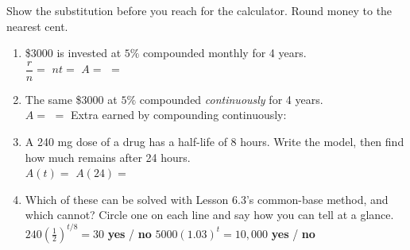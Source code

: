 \documentclass[10pt]{article}
\begin{document}
\begin{practicebox}
Show the substitution before you reach for the calculator. Round money to the nearest cent.
\begin{enumerate}[leftmargin=1.7em, itemsep=5pt]
  \item \$3000 is invested at $5\%$ compounded monthly for 4 years. \\[2pt]
        $\dfrac{r}{n}=$ \blank{1.8cm} \quad $nt=$ \blank{1.4cm} \quad
        $A=$ \blank{4.2cm} $=$ \blank{2.2cm}

  \item The same \$3000 at $5\%$ compounded \emph{continuously} for 4 years. \\[2pt]
        $A=$ \blank{3.6cm} $=$ \blank{2.2cm} \quad Extra earned by compounding continuously:
        \blank{1.8cm}

  \item A 240 mg dose of a drug has a half-life of 8 hours. Write the model, then find how much
        remains after 24 hours. \\[2pt]
        $A(t)=$ \blank{4.0cm} \hfill $A(24)=$ \blank{2.4cm}

  \item Which of these can be solved with Lesson 6.3's common-base method, and which cannot? Circle
        one on each line and say how you can tell at a glance.
        \\[2pt]
        \hspace*{1.0em} $240\left(\frac12\right)^{t/8}=30$ \quad \textbf{yes} / \textbf{no}
        \hfill
        $5000(1.03)^{t}=10{,}000$ \quad \textbf{yes} / \textbf{no}
        \\[2pt]
        \writeline
\end{enumerate}
\end{practicebox}
\end{document}
